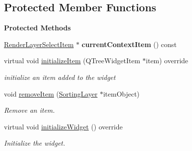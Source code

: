 \subsection*{Protected Member Functions}
\begin{Indent}\textbf{ Protected Methods}\par
\begin{DoxyCompactItemize}
\item 
\mbox{\label{classrev_1_1_view_1_1_render_layer_select_widget_a1d7df816add705eee20a799fbd99d23f}} 
\mbox{\hyperlink{classrev_1_1_view_1_1_render_layer_select_item}{Render\+Layer\+Select\+Item}} $\ast$ {\bfseries current\+Context\+Item} () const
\item 
\mbox{\label{classrev_1_1_view_1_1_render_layer_select_widget_afe1f8355d196dc8b8d780e0d16e7e8db}} 
virtual void \mbox{\hyperlink{classrev_1_1_view_1_1_render_layer_select_widget_afe1f8355d196dc8b8d780e0d16e7e8db}{initialize\+Item}} (Q\+Tree\+Widget\+Item $\ast$item) override
\begin{DoxyCompactList}\small\item\em initialize an item added to the widget \end{DoxyCompactList}\item 
\mbox{\label{classrev_1_1_view_1_1_render_layer_select_widget_ad1bfd4fe65d33df03b75593c84436481}} 
void \mbox{\hyperlink{classrev_1_1_view_1_1_render_layer_select_widget_ad1bfd4fe65d33df03b75593c84436481}{remove\+Item}} (\mbox{\hyperlink{structrev_1_1_sorting_layer}{Sorting\+Layer}} $\ast$item\+Object)
\begin{DoxyCompactList}\small\item\em Remove an item. \end{DoxyCompactList}\item 
\mbox{\label{classrev_1_1_view_1_1_render_layer_select_widget_a956c80433c7758de915c24691fa1c3aa}} 
virtual void \mbox{\hyperlink{classrev_1_1_view_1_1_render_layer_select_widget_a956c80433c7758de915c24691fa1c3aa}{initialize\+Widget}} () override
\begin{DoxyCompactList}\small\item\em Initialize the widget. \end{DoxyCompactList}\item 

\end{DoxyCompactItemize}
\end{Indent}

